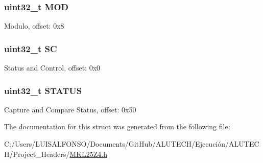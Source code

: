 \subsubsection[{M\+O\+D}]{\setlength{\rightskip}{0pt plus 5cm}uint32\+\_\+t M\+O\+D}\label{struct_t_p_m___mem_map_a6a5f9ba7d911c8faacbe7b1f4f697c36}
Modulo, offset\+: 0x8 \hypertarget{struct_t_p_m___mem_map_aad171b536497d5fa1a596d4d1c620175}{}
\subsubsection[{S\+C}]{\setlength{\rightskip}{0pt plus 5cm}uint32\+\_\+t S\+C}\label{struct_t_p_m___mem_map_aad171b536497d5fa1a596d4d1c620175}
Status and Control, offset\+: 0x0 \hypertarget{struct_t_p_m___mem_map_a3f9158fbf21c247984a9c169ebe43143}{}
\subsubsection[{S\+T\+A\+T\+U\+S}]{\setlength{\rightskip}{0pt plus 5cm}uint32\+\_\+t S\+T\+A\+T\+U\+S}\label{struct_t_p_m___mem_map_a3f9158fbf21c247984a9c169ebe43143}
Capture and Compare Status, offset\+: 0x50 

The documentation for this struct was generated from the following file\+:\begin{DoxyCompactItemize}
\item 
C\+:/\+Users/\+L\+U\+I\+S\+A\+L\+F\+O\+N\+S\+O/\+Documents/\+Git\+Hub/\+A\+L\+U\+T\+E\+C\+H/\+Ejecución/\+A\+L\+U\+T\+E\+C\+H/\+Project\+\_\+\+Headers/\hyperlink{_m_k_l25_z4_8h}{M\+K\+L25\+Z4.\+h}\end{DoxyCompactItemize}
